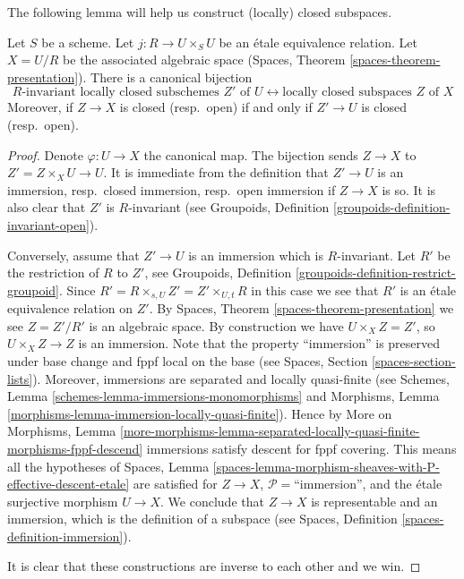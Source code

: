 \noindent
The following lemma will help us construct
(locally) closed subspaces.

\begin{lemma}
\label{lemma-subspaces-presentation}
Let $S$ be a scheme. Let $j : R \to U \times_S U$ be an \'etale equivalence
relation. Let $X = U/R$ be the associated algebraic space
(Spaces, Theorem \ref{spaces-theorem-presentation}). There is a
canonical bijection
$$
R\text{-invariant locally closed subschemes }Z'\text{ of }U
\leftrightarrow
\text{locally closed subspaces }Z\text{ of }X
$$
Moreover, if $Z \to X$ is closed (resp.\ open) if and only if
$Z' \to U$ is closed (resp.\ open).
\end{lemma}

\begin{proof}
Denote $\varphi : U \to X$ the canonical map. The bijection sends
$Z \to X$ to $Z' = Z \times_X U \to U$. It is immediate from the definition
that $Z' \to U$ is an immersion, resp.\ closed immersion, resp.\ open
immersion if $Z \to X$ is so. It is also clear that $Z'$ is $R$-invariant
(see Groupoids, Definition \ref{groupoids-definition-invariant-open}).

\medskip\noindent
Conversely, assume that $Z' \to U$ is an immersion which is $R$-invariant.
Let $R'$ be the restriction of $R$ to $Z'$, see
Groupoids, Definition \ref{groupoids-definition-restrict-groupoid}.
Since $R' = R \times_{s, U} Z' = Z' \times_{U, t} R$ in this case
we see that $R'$ is an \'etale equivalence relation on $Z'$. By
Spaces, Theorem \ref{spaces-theorem-presentation} we see
$Z = Z'/R'$ is an algebraic space. By construction we have
$U \times_X Z = Z'$, so $U \times_X Z \to Z$ is an immersion.
Note that the property ``immersion'' is preserved under base change
and fppf local on the base (see Spaces, Section \ref{spaces-section-lists}).
Moreover, immersions are separated and locally quasi-finite (see
Schemes, Lemma \ref{schemes-lemma-immersions-monomorphisms}
and
Morphisms, Lemma \ref{morphisms-lemma-immersion-locally-quasi-finite}).
Hence by More on Morphisms, Lemma
\ref{more-morphisms-lemma-separated-locally-quasi-finite-morphisms-fppf-descend}
immersions satisfy descent for fppf covering. This means all the hypotheses of
Spaces,
Lemma \ref{spaces-lemma-morphism-sheaves-with-P-effective-descent-etale}
are satisfied for $Z \to X$, $\mathcal{P}=$``immersion'',
and the \'etale surjective morphism $U \to X$. We conclude that $Z \to X$
is representable and an immersion, which is the
definition of a subspace (see
Spaces, Definition \ref{spaces-definition-immersion}).

\medskip\noindent
It is clear that these constructions are inverse to each other and we win.
\end{proof}

